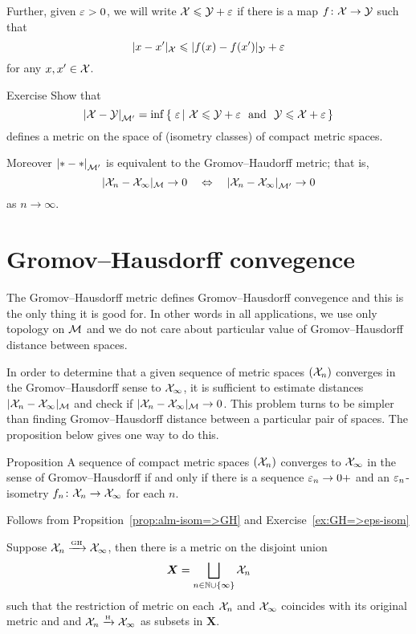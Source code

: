 Further, given $\varepsilon>0$, we will write $\mathcal{X}\leqslant \mathcal{Y}+\varepsilon$
if there is a map $f\colon\mathcal{X}\to \mathcal{Y}$ such that 
$$|x-x'|_{\mathcal{X}}\leqslant|f(x)-f(x')|_{\mathcal{Y}}+\varepsilon$$
for any $x,x'\in \mathcal{X}$.

\begin{thm}{Exercise}\label{ex:GH-po}
Show that 
$$\dist{\spc{X}}{\spc{Y}}{\spc{M}'}=\inf\set{\eps}{\spc{X}\le \spc{Y}+\eps\ \ \text{and}\ \ \spc{Y}\le \spc{X}+\eps}$$
defines a metric on the space of (isometry classes) of compact metric spaces.

Moreover $\dist{*}{*}{\spc{M}'}$ is equivalent to the Gromov--Haudorff metric;
that is,
$$|\spc{X}_n-\spc{X}_\infty|_{\mathcal{M}}\to 0 \ \ \ \Leftrightarrow\ \ \ \dist{\spc{X}_n}{\spc{X}_\infty}{\spc{M}'}\to 0$$ 
as $n\to\infty$.
\end{thm}


\section{Gromov--Hausdorff convegence}

The Gromov--Hausdorff metric defines Gromov--Hausdorff convegence
and this is the only thing it is good for.
In other words in all applications, we use only topology on $\mathcal{M}$
and we do not care about particular value of Gromov--Hausdorff distance between spaces.

In order to determine that a given sequence of metric spaces $(\mathcal{X}_n)$ converges in the Gromov--Hausdorff sense to $\mathcal{X}_\infty$, it is sufficient to estimate distances $|\mathcal{X}_n-\mathcal{X}_\infty|_{\mathcal{M}}$ and  check if $|\mathcal{X}_n-\mathcal{X}_\infty|_{\mathcal{M}}\to 0$.
This problem turns to be simpler than finding Gromov--Hausdorff distance between a particular pair of spaces.
The proposition below gives one way to do this.

\begin{thm}{Proposition}\label{prop:GH-e-isom}
A sequence of compact metric spaces $(\mathcal{X}_n)$ converges to  $\mathcal{X}_\infty$ in the sense of Gromov--Hausdorff if and only if there is a sequence $\varepsilon_n\to0+$
and an $\varepsilon_n$-isometry $f_n\colon\mathcal{X}_n\to \mathcal{X}_\infty$ for each $n$.
\end{thm}

 Follows from Propsition~\ref{prop:alm-isom=>GH} and Exercise~\ref{ex:GH=>eps-isom}
\qeds

Suppose $\mathcal{X}_n\xrightarrow{\mbox{\tiny GH}} \mathcal{X}_\infty$, then there is a metric on the disjoint union 
\[\bm{X}=\bigsqcup_{n\in \mathbb{N}\cup\{\infty\}} \mathcal{X}_n\]
such that the restriction of metric on each $\mathcal{X}_n$ and $\mathcal{X}_\infty$ coincides with its original metric and and $\mathcal{X}_n\xrightarrow{\mbox{\tiny H}} \mathcal{X}_\infty$ as subsets in $\bm{X}$.

